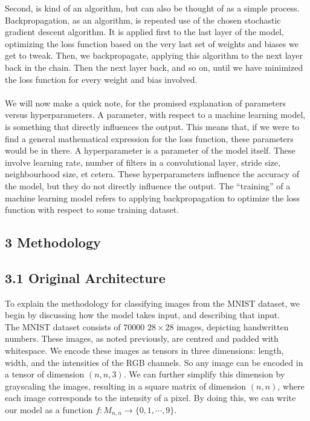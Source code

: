 \documentclass{article}
\begin{document}
Second, is kind of an algorithm, but can also be thought of as a simple process. Backpropagation, as an algorithm, is repeated use of the chosen stochastic gradient descent algorithm. It is applied first to the last layer of the model, optimizing the loss function based on the very last set of weights and biases we get to tweak. Then, we backpropagate, applying this algorithm to the next layer back in the chain. Then the next layer back, and so on, until we have minimized the loss function for every weight and bias involved.\\\\

We will now make a quick note, for the promised explanation of parameters versus hyperparameters. A parameter, with respect to a machine learning model, is something that directly influences the output. This means that, if we were to find a general mathematical expression for the loss function, these parameters would be in there. A hyperparameter is a parameter of the model itself. These involve learning rate, number of filters in a convolutional layer, stride size, neighbourhood size, et cetera. These hyperparameters influence the accuracy of the model, but they do not directly influence the output. The ``training'' of a machine learning model refers to applying backpropagation to optimize the loss function with respect to some training dataset.

\subsection*{3 Methodology}
\subsection*{3.1 Original Architecture}
To explain the methodology for classifying images from the MNIST dataset, we begin by discussing how the model takes input, and describing that input. \\

The MNIST dataset consists of $70000$ $28\times 28$ images, depicting handwritten numbers. These images, as noted previously, are centred and padded with whitespace. We encode these images as tensors in three dimensions: length, width, and the intensities of the RGB channels. So any image can be encoded in a tensor of dimension $(n, n, 3)$. We can further simplify this dimension by grayscaling the images, resulting in a square matrix of dimension $(n, n)$, where each image corresponds to the intensity of a pixel. By doing this, we can write our model as a function $f: M_{n,n} \rightarrow  \{0,1,\cdots,9\}$.\\
\end{document}
